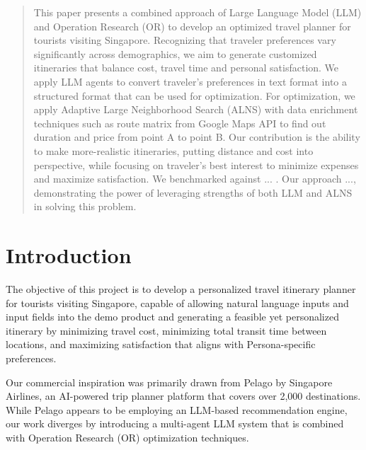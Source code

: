 \documentclass{ecai}
\begin{document}
\begin{frontmatter}
\begin{abstract}
This paper presents a combined approach of Large Language Model (LLM) and Operation Research (OR) to develop an optimized travel planner for tourists visiting Singapore. Recognizing that traveler preferences vary significantly across demographics, we aim to generate customized itineraries that balance cost, travel time and personal satisfaction. We apply LLM agents to convert traveler's preferences in text format into a structured format that can be used for optimization. For optimization, we apply Adaptive Large Neighborhood Search (ALNS) with data enrichment techniques such as route matrix from Google Maps API to find out duration and price from point A to point B. Our contribution is the ability to make more-realistic itineraries, putting distance and cost into perspective, while focusing on traveler's best interest to minimize expenses and maximize satisfaction. We benchmarked against ... . Our approach ..., demonstrating the power of leveraging strengths of both LLM and ALNS in solving this problem.

\end{abstract}

\end{frontmatter}


\section{Introduction}
The objective of this project is to develop a personalized travel itinerary planner for tourists visiting Singapore, capable of allowing natural language inputs and input fields into the demo product and generating a feasible yet personalized itinerary by minimizing travel cost, minimizing total transit time between locations, and maximizing satisfaction that aligns with Persona-specific preferences.

Our commercial inspiration was primarily drawn from Pelago by Singapore Airlines, an AI-powered trip planner platform that covers over 2,000 destinations. While Pelago appears to be employing an LLM-based recommendation engine, our work diverges by introducing a multi-agent LLM system that is combined with Operation Research (OR) optimization techniques.
\end{document}
